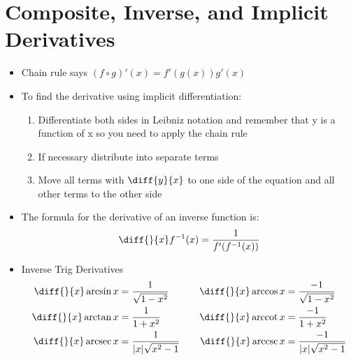 \documentclass{article}
\DeclareMathOperator{\arcsec}{arcsec}
\DeclareMathOperator{\arccot}{arccot}
\DeclareMathOperator{\arccsc}{arccsc}
\begin{document}
\section{Composite, Inverse, and Implicit Derivatives}
\begin{itemize}
    \item Chain rule says $(f\circ g)'(x) = f'(g(x))g'(x)$
    \item To find the derivative using implicit differentiation:
    \begin{enumerate}
        \item Differentiate both sides in Leibniz notation and remember that y is a function of x so you need to apply the chain rule
        \item If necessary distribute into separate terms
        \item Move all terms with $\diff{y}{x}$ to one side of the equation and all other terms to the other side
    \end{enumerate}
    \item The formula for the derivative of an inverse function is:
    \[
        \diff{}{x}f^{-1}(x) = \frac{1}{f'(f^{-1}(x))}
    \]
    \item Inverse Trig Derivatives
        \begin{equation*}
            \begin{aligned}[c]
            \diff{}{x} \arcsin x &= \frac{1}{\sqrt{1-x^2}} \\
            \diff{}{x} \arctan x &= \frac{1}{1+x^2} \\
            \diff{}{x} \arcsec x &= \frac{1}{|x|\sqrt{x^2-1}}
            \end{aligned}
            \qquad
            \begin{aligned}[c]
            \diff{}{x} \arccos x &= \frac{-1}{\sqrt{1-x^2}} \\
            \diff{}{x} \arccot x &= \frac{-1}{1+x^2} \\
            \diff{}{x} \arccsc x &= \frac{-1}{|x|\sqrt{x^2-1}}
            \end{aligned}
        \end{equation*}
\end{itemize}

\newpage
\end{document}
